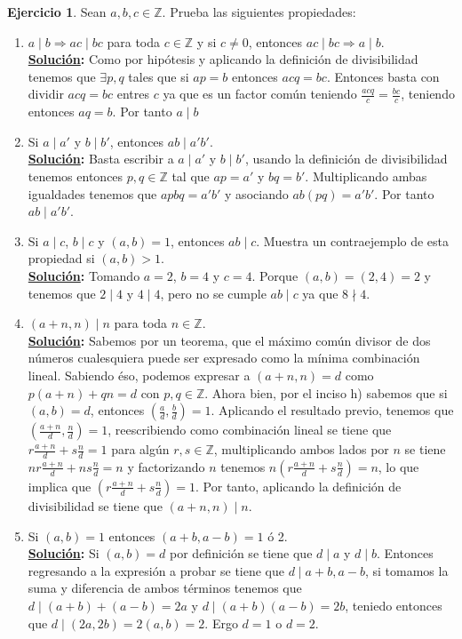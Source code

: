\documentclass[11pt,letterpaper]{article}
\theoremstyle{definition}\newtheorem{p}{Ejercicio}
\theoremstyle{definition}\newtheorem{pp}[p]{$(*)$Ejercicio}
\numberwithin{p}{section}
\newcommand{\Z}{\mathbb{Z}}
\newcommand{\ent}{\Longrightarrow}
\newcommand{\sol}{\textbf{\underline{Solución}: }} %
\begin{document}
%
\begin{p} Sean $a,b,c\in\Z$. Prueba las siguientes propiedades:
  \begin{enumerate}
  \item $a\mid b \ent ac\mid bc$ para toda $c\in\Z$ y si $c\neq 0$, entonces $ac\mid bc \ent a\mid b$. \\
  \sol Como por hipótesis y aplicando la definición de divisibilidad tenemos que $\exists p, q$ tales que 
  si $ap=b$ entonces $acq=bc$. Entonces basta con dividir $acq=bc$ entres $c$ ya que es un factor común 
  teniendo $\frac{acq}{c}=\frac{bc}{c}$, teniendo entonces $aq=b$. Por tanto $a \mid b$
  
  \item Si $a\mid a'$ y $b\mid b'$, entonces $a b\mid a'b'$. \\
  \sol Basta escribir a $a \mid a'$ y $b\mid b'$, usando la definición de divisibilidad tenemos entonces 
  $p, q \in \Z$ tal que $ap=a'$ y $bq=b'$. Multiplicando ambas igualdades tenemos que $apbq=a'b'$ y asociando 
  $ab(pq)=a'b'$. Por tanto $a b \mid a'b'$.
  
  \item Si $a\mid c$, $b\mid c$ y $(a,b)=1$, entonces $ab\mid c$. Muestra un contraejemplo de esta 
  propiedad si $(a,b)>1$. \\
  \sol Tomando $a=2$, $b=4$ y $c=4$. Porque $(a,b) = (2, 4) = 2$ y tenemos que  $2 \mid 4$ y $4 \mid 4$, 
  pero no se cumple $ab\mid c$ ya que $8 \nmid 4$.
  
  \item $(a+n,n)\mid n$ para toda $n\in\Z$.\\
  \sol Sabemos por un teorema, que el máximo común divisor de dos números cualesquiera puede ser expresado 
  como la mínima combinación lineal. Sabiendo éso, podemos expresar a $(a+n, n) = d$ como $p(a+n) + qn = d$ 
  con $p, q \in \Z$.  Ahora bien, por el inciso h) sabemos que si $(a,b)=d$, entonces $(\frac{a}{d}, \frac{b}{d}) = 1$. 
  Aplicando el resultado previo, tenemos que $(\frac{a+n}{d}, \frac{n}{d}) = 1$, reescribiendo como combinación 
  lineal se tiene que $r\frac{a+n}{d} + s\frac{n}{d} = 1$ para algún $r, s \in \Z$, multiplicando ambos lados por $n$ 
  se tiene $nr\frac{a+n}{d} + ns\frac{n}{d} = n$ y factorizando $n$ tenemos $n(r\frac{a+n}{d} + s\frac{n}{d}) = n$,
  lo que implica que $(r\frac{a+n}{d} + s\frac{n}{d}) = 1$. Por tanto, aplicando la definición de divisibilidad 
  se tiene que $(a+n,n)\mid n$.
  
  \item Si $(a,b)=1$ entonces $(a+b,a-b)=1$ \'o 2.\\
  \sol Si $(a,b)=d$ por definición se tiene que $d \mid a$ y $d \mid b$. Entonces regresando  a la expresión a 
  probar se tiene que $d \mid a+b, a-b$, si tomamos la suma y diferencia de ambos términos tenemos que 
  $d \mid (a+b)+(a-b)=2a$ y $d \mid (a+b)(a-b)=2b$, teniedo entonces que $d \mid (2a,2b)=2(a,b)=2$. 
  Ergo $d=1$ o $d=2$.
  

\end{enumerate}
\end{p}
\end{document}
